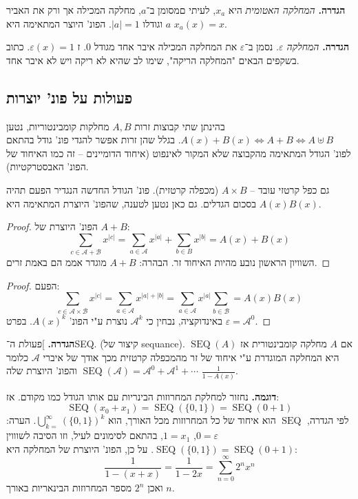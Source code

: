 \documentclass[]{article}
\newcommand\ac    {\mathcal{A}}
\newcommand\bc    {\mathcal{B}}
\newcommand\epsi  {\varepsilon}
\DeclareMathOperator\seq   {SEQ}
\renewcommand\inf {\infty}
\begin{document}
	\textbf{הגדרה. }\textit{המחלקה האטומית} היא $x_a$, לעיתי םמסומן ב־$a$, מחלקה המכילה אך ורק את האביר $a$ וגודלו $|a| = 1$. הפונ' היוצר המתאימה היא $x_a(x) = x$. 
	
	\textbf{הגדרה. }\textit{המחלקה $\epsi$}. נסמן ב־$\epsi$ את המחלקה המכילה איבר אחד מגודל $0$. ז $\epsi(x) = 1$. כתוב בשקפים הבאים "המחלקה הריקה", שימו לב שהיא לא ריקה ויש לא איבר אחד. 
	
	\subsection{פעולות על פונ' יוצרות}
	בהינתן שתי קבוצות זרות $A, B$ מחלקות קומבינטוריות, נטען $A(x) + B(x) \iff A + B \iff A \uplus B$. בגלל שהן זרות אפשר להגדי פונ' גודל בהתאם לפונ' הגודל המתאימה מהקבוצה שלא המקור לאינפוט (איחוד הדומיינים – זה כמו האיחוד של הפונ' האבסטרקטיות). 
	
	גם כפל קרטזי עובד – $A \times B$ (מכפלה קרטזית). פונ' הגודל החדשה הנגדיר הפעם תהיה בסכום הגדלים. גם כאן נטען לטענה, שהפונ' היוצרת המתאימה היא $A(x)B(x)$. 
	
	\begin{proof}
		הפונ' היוצרת של $A +B$: 
		\[ \sum_{c \in \ac + \bc} x^{|c|} = \sum_{a \in \ac} x^{|a|} + \sum_{b \in B} x^{|b|} = A(x) + B(x) \]
		השוויון הראשון נובע מהיות האיחוד זר. הבהרה: $A + B$ מוגדר אממ הם באמת זרים. 
	\end{proof}
	\begin{proof}
		הפעם: 
		\[ \sum_{c \in \ac \times \bc} x^{|c|} = \sum_{a \in \ac} x^{|a| + |b|} = \sum_{a \in \ac} x^{|a|} \sum_{b \in \bc} = A(x)B(x) \]
		באינדוקציה, נבחין כי $\ac^k$ נוצרת ע"י הפונ' $A(x)^{k}$. בפרט $\epsi = \ac^{0}$. 
	\end{proof}
	
	\textbf{הגדרה. }]פעולת ה־SEQ. (קיצור של sequance). אם $A$ מחלקה קומבינטורית אז $\seq(A)$ היא המחלקה המוגדרת ע"י איחוד של זר מהמכפלה קרטזית מכך אודך של איברי $\ac$ כלומר 
	$\seq(\ac) = \ac^{0} + \ac^{1} + \cdots$
	והפונ' היוצרת שלה $\frac{1}{1 - A(x)}$. 
	
	\textbf{דוגמה. }נחזור למחלקת המחרוזות הבינריות עם אותו הגודל כמו מקודם. אז: 
	\[ \seq(x_0 + x_1) = \seq(\{0, 1\}) = \seq(0 + 1) \]
	לפי הגדרה, $\seq$ הוא איחוד של כל המחרוזות מכל האורך, הוא $\bigcup_{k = }^{\inf} (\{0, 1\})^{k}$. הערה: $0 = \epsi$, $1 =  x_1$, בהתאם לסימונים לעיל, וזו הסיבה לשוווין $\seq(\{0, 1\})  = \seq(0 + 1)$. על כן, הפונ' היוצרת של המחלקה היא:
	 \[ \frac{1}{1 - (x + x)} = \frac{1}{1 - 2x} = \sum_{n = 0}^{\inf}2^{n}x^{n} \]
	 ואכן $2^n$ מספר המחרוזות הבינאריות באורך $n$. 
	 
\end{document}
